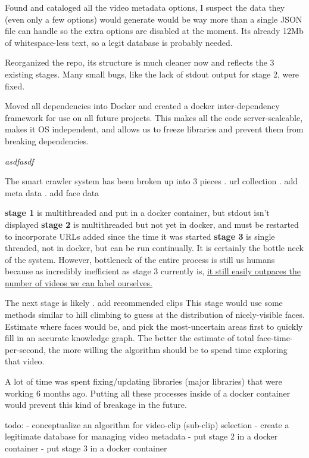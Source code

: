 \documentclass{article}
\newcommand{\br}{ \hfill \break}
\begin{document}
%
%
%
\date{February 3 2020} \br \begin{adjustwidth}{2.5em}{0pt}

Found and cataloged all the video metadata options, I suspect the data they (even only a few options) would generate would be way more than a single JSON file can handle so the extra options are disabled at the moment. Its already 12Mb of whitespace-less text, so a legit database is probably needed.\br

Reorganized the repo, its structure is much cleaner now and reflects the 3 existing stages. Many small bugs, like the lack of stdout output for stage 2, were fixed.
\br

Moved all dependencies into Docker and created a docker inter-dependency framework for use on all future projects. This makes all the code server-scaleable, makes it OS independent, and allows us to freeze libraries and prevent them from breaking dependencies.
\br

\textit{asdfasdf}


\end{adjustwidth} \br 
\date{January 29 2020} \br \begin{adjustwidth}{2.5em}{0pt}


The smart crawler system has been broken up into 3 pieces  \br
1. url collection  \br
2. add meta data  \br
3. add face data   \br

\textbf{stage 1} is multithreaded and put in a docker container, but stdout isn't displayed \br
\textbf{stage 2} is multithreaded but not yet in docker, and must be restarted to incorporate URLs added since the time it was started \br
\textbf{stage 3} is single threaded, not in docker, but can be run continually. It is certainly the bottle neck of the system. However, bottleneck of the entire process is still us humans because as incredibly inefficient as stage 3 currently is, \underline{it still easily outpaces the number of videos we can label ourselves.} \br

The next stage is likely \br
4. add recommended clips \br
This stage would use some methods similar to hill climbing to guess at the distribution of nicely-visible faces. Estimate where faces would be, and pick the most-uncertain areas first to quickly fill in an accurate knowledge graph. The better the estimate of total face-time-per-second, the more willing the algorithm should be to spend time exploring that video.

\br\br
A lot of time was spent fixing/updating libraries (major libraries) that were working 6 months ago. Putting all these processes inside of a docker container would prevent this kind of breakage in the future.

\br
todo:\br
- conceptualize an algorithm for video-clip (sub-clip) selection \br
- create a legitimate database for managing video metadata \br
- put stage 2 in a docker container \br
- put stage 3 in a docker container \br
\br \br
\end{adjustwidth} \br 
\end{document}
